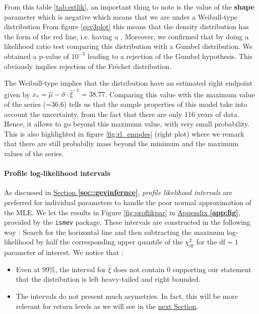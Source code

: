 From this table \ref{tab:estlik}, an important thing to note is the value of the \textbf{shape} parameter which is negative which means that we are under a Weibull-type distribution  From figure \ref{gev3plot} this means that the density distribution has the form of the red line, i.e. having a .
Moreover, we confirmed that by doing a likelihood ratio test comparing this distribution with a Gumbel distribution. We obtained a p-value of $10^{-3}$ leading to a rejection of the Gumbel hypothesis. This obviously implies rejection of the Fréchet distribution.

The Weibull-type implies that the distribution have an estimated right endpoint given by $\hat{x}_*=\hat{\mu}-\hat{\sigma}\cdot\hat{\xi}^{-1}=38.77$. Comparing this value with the maximum value of the series (=36.6) tells us that the sample properties of this model take into account the uncertainty, from the fact that there are only 116 years of data. Hence, it allows to go beyond this maximum value, with very small probability. This is also highlighted in figure \ref{fig:rl_empdes} (right plot) where we remark that there are still probabiliy mass beyond the minimum and the maximum values of the series.

\paragraph*{Profile log-likelihood intervals} 
As discussed in \hyperref[sec:g]{Section \textbf{\ref{sec::gevinfernce}}}, \emph{profile likelihood intervals} are preferred for individual parameters to handle the poor normal approximation of the MLE. We let the results in Figure \ref{fig:proflikpar} in \hyperref[app:fig]{Appendix \textbf{\ref{app:fig}}}, provided by the \texttt{ismev} package.
These intervals are constructed in the following way : Search for the horizontal line and then subtracting the maximum log-likelihood by half the corresponding upper quantile of the $\chi^2_{\text{df}}$ for the $\text{df}=1$ parameter of interest. We notice that :
\begin{itemize}
	\item Even at $99\%$, the interval for $\hat{\xi}$ does not contain 0 supporting our statement that the distribution is left heavy-tailed and right bounded.
	\item The intervals do not present much asymetries. In fact, this will be more relevant for return levels as we will see in the \hyperref[sec:rlemp]{next Section}.
\end{itemize}


